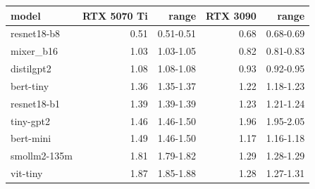 \begin{tabular}{lrrrr}
\toprule
model & RTX 5070 Ti & range & RTX 3090 & range \\
\midrule
resnet18-b8 & 0.51 & 0.51-0.51 & 0.68 & 0.68-0.69 \\
mixer\_b16 & 1.03 & 1.03-1.05 & 0.82 & 0.81-0.83 \\
distilgpt2 & 1.08 & 1.08-1.08 & 0.93 & 0.92-0.95 \\
bert-tiny & 1.36 & 1.35-1.37 & 1.22 & 1.18-1.23 \\
resnet18-b1 & 1.39 & 1.39-1.39 & 1.23 & 1.21-1.24 \\
tiny-gpt2 & 1.46 & 1.46-1.50 & 1.96 & 1.95-2.05 \\
bert-mini & 1.49 & 1.46-1.50 & 1.17 & 1.16-1.18 \\
smollm2-135m & 1.81 & 1.79-1.82 & 1.29 & 1.28-1.29 \\
vit-tiny & 1.87 & 1.85-1.88 & 1.28 & 1.27-1.31 \\
\bottomrule
\end{tabular}

